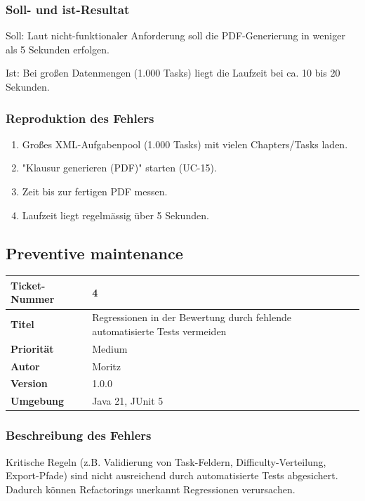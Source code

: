 \documentclass[a4paper]{article}
\begin{document}
\subsubsection*{Soll- und ist-Resultat}
Soll: Laut nicht-funktionaler Anforderung soll die PDF-Generierung in weniger als 5 Sekunden erfolgen. 

Ist: Bei großen Datenmengen (1.000 Tasks) liegt die Laufzeit bei ca. 10 bis 20 Sekunden.

\subsubsection*{Reproduktion des Fehlers} 

\begin{enumerate}
    \item Großes XML-Aufgabenpool (1.000 Tasks) mit vielen Chapters/Tasks laden.
    \item "Klausur generieren (PDF)" starten (UC-15).
    \item Zeit bis zur fertigen PDF messen.
    \item Laufzeit liegt regelmässig über 5 Sekunden.
\end{enumerate}

\newpage
\subsection{Preventive maintenance}

\begin{center}
\begin{tabular}{|p{3cm}|p{8cm}|}
\hline
\textbf{Ticket-Nummer} & 4 \\
\hline
\textbf{Titel} & Regressionen in der Bewertung durch fehlende automatisierte Tests vermeiden \\
\hline
\textbf{Priorität} & Medium \\
\hline
\textbf{Autor} & Moritz \\
\hline
\textbf{Version} & 1.0.0 \\
\hline
\textbf{Umgebung} & Java 21, JUnit 5 \\
\hline
\end{tabular}
\end{center}

\subsubsection*{Beschreibung des Fehlers}
Kritische Regeln (z.B. Validierung von Task-Feldern, Difficulty-Verteilung, Export-Pfade) sind nicht ausreichend durch automatisierte Tests abgesichert. Dadurch können Refactorings unerkannt Regressionen verursachen.
\end{document}
